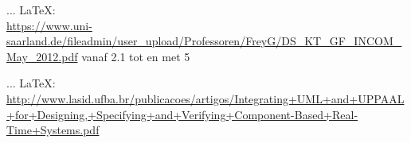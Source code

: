 \begin{thebibliography}{99}
{{{{{{{						%
						
						
						
						
						 ... \LaTeX:\\ \url{https://www.uni-saarland.de/fileadmin/user_upload/Professoren/FreyG/DS_KT_GF_INCOM_May_2012.pdf}
						vanaf 2.1 tot en met 5
						
						 ... \LaTeX:\\ \url{http://www.lasid.ufba.br/publicacoes/artigos/Integrating+UML+and+UPPAAL+for+Designing,+Specifying+and+Verifying+Component-Based+Real-Time+Systems.pdf}
						
}}}}}}}
\end{thebibliography}
